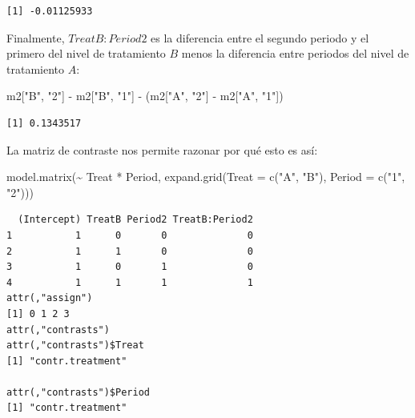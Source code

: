 \documentclass[
  12pt,
  a4paper,
  extrafontsizes,
  onecolumn,
  openright]{memoir}
\newenvironment{Shaded}{\begin{snugshade}}{\end{snugshade}}
\newcommand{\AttributeTok}[1]{\textcolor[rgb]{0.40,0.45,0.13}{#1}}
\newcommand{\FunctionTok}[1]{\textcolor[rgb]{0.28,0.35,0.67}{#1}}
\newcommand{\NormalTok}[1]{\textcolor[rgb]{0.00,0.23,0.31}{#1}}
\newcommand{\SpecialCharTok}[1]{\textcolor[rgb]{0.37,0.37,0.37}{#1}}
\newcommand{\StringTok}[1]{\textcolor[rgb]{0.13,0.47,0.30}{#1}}
\begin{document}
\begin{verbatim}
[1] -0.01125933
\end{verbatim}

\normalsize

Finalmente, \(TreatB:Period2\) es la diferencia entre el segundo periodo
y el primero del nivel de tratamiento \(B\) menos la diferencia entre
periodos del nivel de tratamiento \(A\):

\scriptsize

\begin{Shaded}
\begin{Highlighting}[]
\NormalTok{m2[}\StringTok{"B"}\NormalTok{, }\StringTok{"2"}\NormalTok{] }\SpecialCharTok{{-}}\NormalTok{ m2[}\StringTok{"B"}\NormalTok{, }\StringTok{"1"}\NormalTok{] }\SpecialCharTok{{-}}\NormalTok{ (m2[}\StringTok{"A"}\NormalTok{, }\StringTok{"2"}\NormalTok{] }\SpecialCharTok{{-}}\NormalTok{ m2[}\StringTok{"A"}\NormalTok{, }\StringTok{"1"}\NormalTok{])}
\end{Highlighting}
\end{Shaded}

\begin{verbatim}
[1] 0.1343517
\end{verbatim}

\normalsize

La matriz de contraste nos permite razonar por qué esto es así:

\scriptsize

\begin{Shaded}
\begin{Highlighting}[]
\FunctionTok{model.matrix}\NormalTok{(}\SpecialCharTok{\textasciitilde{}}\NormalTok{ Treat }\SpecialCharTok{*}\NormalTok{ Period, }\FunctionTok{expand.grid}\NormalTok{(}\AttributeTok{Treat =} \FunctionTok{c}\NormalTok{(}\StringTok{"A"}\NormalTok{, }\StringTok{"B"}\NormalTok{), }\AttributeTok{Period =} \FunctionTok{c}\NormalTok{(}\StringTok{"1"}\NormalTok{, }\StringTok{"2"}\NormalTok{)))}
\end{Highlighting}
\end{Shaded}

\begin{verbatim}
  (Intercept) TreatB Period2 TreatB:Period2
1           1      0       0              0
2           1      1       0              0
3           1      0       1              0
4           1      1       1              1
attr(,"assign")
[1] 0 1 2 3
attr(,"contrasts")
attr(,"contrasts")$Treat
[1] "contr.treatment"

attr(,"contrasts")$Period
[1] "contr.treatment"
\end{verbatim}
\end{document}
